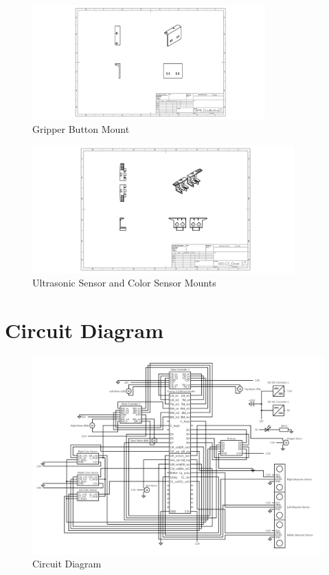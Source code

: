 \documentclass[12pt]{report}
\begin{document}
\begin{figure}[H]
    \centering
    \includegraphics[width=0.8\textwidth]{Images/3D prints/GRPR_DualButton ENGR Drawing.JPG}
    \caption{Gripper Button Mount}
    \label{fig:GRPR_DualButton}
\end{figure}
\begin{figure}[H]
    \centering
    \includegraphics[width=0.9\textwidth]{Images/3D prints/USS-CS_Dual ENGR Drawing.JPG}
    \caption{Ultrasonic Sensor and Color Sensor Mounts}
    \label{fig:USS-CS_Dual}
\end{figure}
\section{Circuit Diagram}
\begin{figure}[H]
    \centering
    \includegraphics[width = 1.2\textwidth,angle=90, keepaspectratio]{Images/Diagrams/circuit (1).png}
    \caption{Circuit Diagram}
    \label{fig:CircuitDiagram}
\end{figure}
\end{document}
